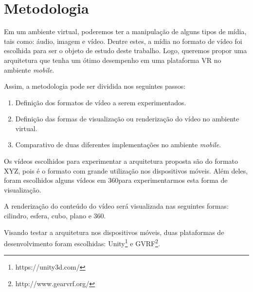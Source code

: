 \section{Metodologia}


Em um ambiente virtual, poderemos ter a manipulação de alguns tipos de mídia, tais como: áudio, imagem e vídeo. Dentre estes, a mídia no formato de vídeo foi escolhida para ser o objeto de estudo deste trabalho. Logo, queremos propor uma arquitetura que tenha um ótimo desempenho em uma plataforma VR no ambiente \textit{mobile}.

Assim, a metodologia pode ser dividida nos seguintes passos:

\begin{enumerate}
    \item Definição dos formatos de vídeo a serem experimentados.
    \item Definição das formas de visualização ou renderização do vídeo no ambiente virtual.
    \item Comparativo de duas diferentes implementações no ambiente \textit{mobile}.
\end{enumerate}

Os vídeos escolhidos para experimentar a arquitetura proposta são do formato XYZ, pois é o formato com grande utilização nos dispositivos móveis. Além deles, foram escolhidos alguns vídeos em 360\degree para experimentarmos esta forma de visualização.

A renderização do conteúdo do vídeo será visualizada nas seguintes formas: cilindro, esfera, cubo, plano e 360\degree.

Visando testar a arquitetura nos dispositivos móveis, duas plataformas de desenvolvimento foram escolhidas: Unity\footnote{https://unity3d.com/} e GVRF\footnote{http://www.gearvrf.org/}.
